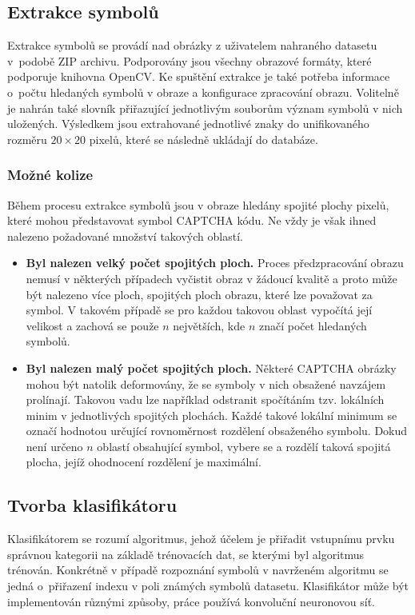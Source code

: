 \documentclass[
  field=ainfp,
  master=true,
  biblatex,
  sourcecodes=false,
  theorems=false,
  glossaries,
  index
]{kidiplom}
\begin{document}
\subsection{Extrakce symbolů}
Extrakce symbolů se provádí nad obrázky z uživatelem nahraného datasetu v~podobě ZIP archivu. Podporovány jsou všechny obrazové formáty, které podporuje knihovna OpenCV. Ke spuštění extrakce je také potřeba informace o~počtu hledaných symbolů v obraze a konfigurace zpracování obrazu. Volitelně je na\-hrán také slovník přiřazující jednotlivým souborům význam symbolů v nich uložených. Výsledkem jsou extrahované jednotlivé znaky do unifikovaného rozměru  $20\times20$ pixelů, které se následně ukládají do databáze.

\subsubsection*{Možné kolize}
Během procesu extrakce symbolů jsou v obraze hledány spojité plochy pixelů, které mohou představovat symbol CAPTCHA kódu. Ne vždy je však ihned nalezeno požadované množství takových oblastí. 
\begin{itemize}
\item \textbf{Byl nalezen velký počet spojitých ploch.} Proces předzpracování ob\-razu nemusí v některých případech vyčistit obraz v žádoucí kvalitě a proto může být nalezeno více ploch, spojitých ploch obrazu, které lze považovat za symbol. V takovém případě se pro každou takovou oblast vypočítá její velikost a zachová se použe $n$ největších, kde $n$ značí počet hledaných symbolů.

\item \textbf{Byl nalezen malý počet spojitých ploch.} Některé CAPTCHA obrázky mohou být natolik deformovány, že se symboly v nich obsažené navzájem prolínají. Takovou vadu lze například odstranit spočítáním tzv. lokálních minim v jednotlivých spojitých plochách. Každé takové lokální minimum se označí hodnotou určující rovnoměrnost rozdělení obsaženého symbolu. Dokud není určeno $n$ oblastí obsahující symbol, vybere se a rozdělí taková spojitá plocha, jejíž ohodnocení rozdělení je maximální.
\end{itemize}


\subsection{Tvorba klasifikátoru}
Klasifikátorem se rozumí algoritmus, jehož účelem je přiřadit vstupnímu prvku správnou kategorii na základě trénovacích dat, se kterými byl algoritmus trénován. Konkrétně v případě rozpoznání symbolů v navrženém algoritmu se jedná o~při\-řazení indexu v poli známých symbolů datasetu. Klasifikátor může být implementován různými způsoby, práce používá konvoluční neuronovou síť.
\end{document}
